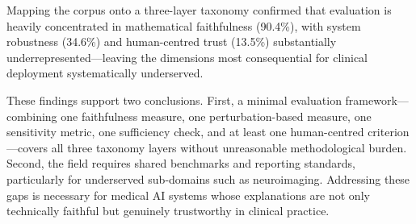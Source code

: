 Mapping the corpus onto a three-layer taxonomy confirmed that evaluation is heavily concentrated in mathematical faithfulness (90.4\%), with system robustness (34.6\%) and human-centred trust (13.5\%) substantially underrepresented---leaving the dimensions most consequential for clinical deployment systematically underserved.

These findings support two conclusions. First, a minimal evaluation framework---combining one faithfulness measure, one perturbation-based measure, one sensitivity metric, one sufficiency check, and at least one human-centred criterion---covers all three taxonomy layers without unreasonable methodological burden. Second, the field requires shared benchmarks and reporting standards, particularly for underserved sub-domains such as neuroimaging. Addressing these gaps is necessary for medical AI systems whose explanations are not only technically faithful but genuinely trustworthy in clinical practice.

